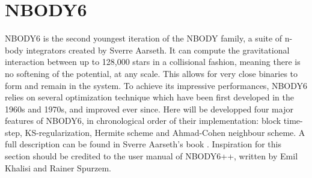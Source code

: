 


\chapter{NBODY6}


NBODY6 is the second youngest iteration of the NBODY family, a suite of n-body integrators created by Sverre Aarseth. It can compute the gravitational interaction between up to 128,000 stars in a collisional fashion, meaning there is no softening of the potential, at any scale. This allows for very close binaries to form and remain in the system. To achieve its impressive performances, NBODY6 relies on several optimization technique which have been first developed in the 1960s and 1970s, and improved ever since. Here will be developped four major features of NBODY6, in chronological order of their implementation: block time-step, KS-regularization, Hermite scheme and Ahmad-Cohen neighbour scheme. A full description can be found in Sverre Aarseth's book \citep{Aarseth2003}. Inspiration for this section should be credited to the user manual of NBODY6++, written by Emil Khalisi and Rainer Spurzem.

